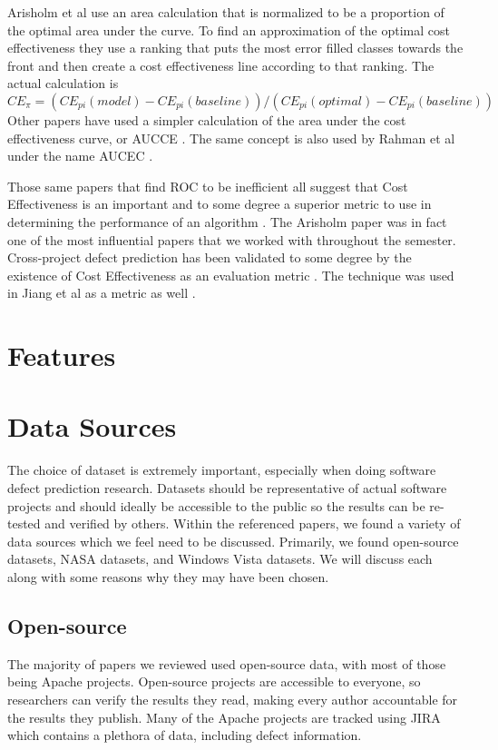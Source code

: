 \documentclass{sig-alternate-05-2015}
\begin{document}
 Arisholm et al use an area calculation that is normalized to be a proportion of the optimal area under the curve.  To find an approximation of the optimal cost effectiveness they use a ranking that puts the most error filled classes towards the front and then create a cost effectiveness line according to that ranking.  The actual calculation is $CE_{\pi} = (CE_{pi}(model) - CE_{pi}(baseline))/ (CE_{pi}(optimal) - CE_{pi}(baseline))$  Other papers have used a simpler calculation of the area under the cost effectiveness curve, or AUCCE \cite{Posnett}.  The same concept is also used by Rahman et al under the name AUCEC \cite{Rahman}.

Those same papers that find ROC to be inefficient all suggest that Cost Effectiveness is an important and to some degree a superior metric to use in determining the performance of an algorithm \cite{Posnett} \cite{Arisholm} \cite{Rahman}.  The Arisholm paper was in fact one of the most influential papers that we worked with throughout the semester.  Cross-project defect prediction has been validated to some degree by the existence of Cost Effectiveness as an evaluation metric \cite{Rahman}.    The technique was used in Jiang et al as a metric as well \cite{Jiang}. 

\section{Features}

\section{Data Sources}
The choice of dataset is extremely important, especially when doing software defect prediction research. Datasets should be representative of actual software projects and should ideally be accessible to the public so the results can be re-tested and verified by others. Within the referenced papers, we found a variety of data sources which we feel need to be discussed. Primarily, we found open-source datasets, NASA datasets, and Windows Vista datasets. We will discuss each along with some reasons why they may have been chosen.
\subsection{Open-source}
The majority of papers we reviewed used open-source data, with most of those being Apache projects. Open-source projects are accessible to everyone, so researchers can verify the results they read, making every author accountable for the results they publish. Many of the Apache projects are tracked using JIRA which contains a plethora of data, including defect information.
\end{document}
